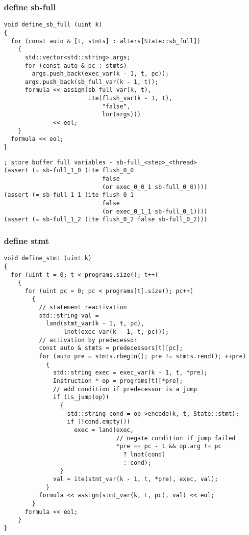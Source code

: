 \subsubsection{define sb-full}

\begin{lstlisting}[style=c++]
void define_sb_full (uint k)
{
  for (const auto & [t, stmts] : alters[State::sb_full])
    {
      std::vector<std::string> args;
      for (const auto & pc : stmts)
        args.push_back(exec_var(k - 1, t, pc));
      args.push_back(sb_full_var(k - 1, t));
      formula << assign(sb_full_var(k, t),
                        ite(flush_var(k - 1, t),
                            "false",
                            lor(args)))
              << eol;
    }
  formula << eol;
}
\end{lstlisting}

\begin{lstlisting}[language=SMTLib]
; store buffer full variables - sb-full_<step>_<thread>
(assert (= sb-full_1_0 (ite flush_0_0
                            false
                            (or exec_0_0_1 sb-full_0_0))))
(assert (= sb-full_1_1 (ite flush_0_1
                            false
                            (or exec_0_1_1 sb-full_0_1))))
(assert (= sb-full_1_2 (ite flush_0_2 false sb-full_0_2)))
\end{lstlisting}

\subsubsection{define stmt}


\begin{lstlisting}[style=c++]
void define_stmt (uint k)
{
  for (uint t = 0; t < programs.size(); t++)
    {
      for (uint pc = 0; pc < programs[t].size(); pc++)
        {
          // statement reactivation
          std::string val =
            land(stmt_var(k - 1, t, pc),
                 lnot(exec_var(k - 1, t, pc)));
          // activation by predecessor
          const auto & stmts = predecessors[t][pc];
          for (auto pre = stmts.rbegin(); pre != stmts.rend(); ++pre)
            {
              std::string exec = exec_var(k - 1, t, *pre);
              Instruction * op = programs[t][*pre];
              // add condition if predecessor is a jump
              if (is_jump(op))
                {
                  std::string cond = op->encode(k, t, State::stmt);
                  if (!cond.empty())
                    exec = land(exec,
                                // negate condition if jump failed
                                *pre == pc - 1 && op.arg != pc
                                  ? lnot(cond)
                                  : cond);
                }
              val = ite(stmt_var(k - 1, t, *pre), exec, val);
            }
          formula << assign(stmt_var(k, t, pc), val) << eol;
        }
      formula << eol;
    }
}
\end{lstlisting}

